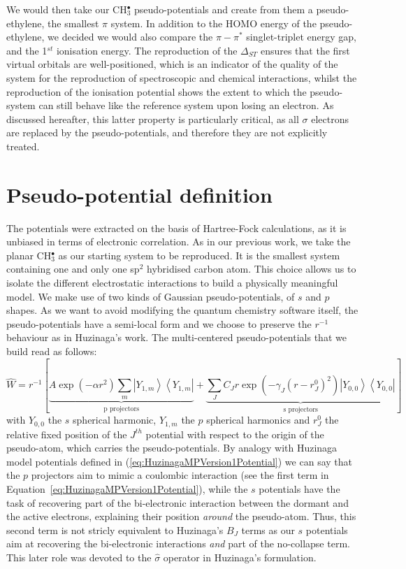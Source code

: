 \documentclass[12pt]{article}
\begin{document}
We would then take our CH$_3^{\bullet}$ pseudo-potentials and create from them a pseudo-ethylene, the smallest $\pi$ system.
In addition to the HOMO energy of the pseudo-ethylene, we decided we would also compare the $\pi-\pi^{*}$ singlet-triplet energy gap, 
and the 1$^{st}$ ionisation energy. 
The reproduction of the $\Delta_{ST}$ ensures that the first virtual 
orbitals are well-positioned, which is an indicator of the quality of the system for the reproduction of spectroscopic and 
chemical interactions, whilst the reproduction of the ionisation potential shows the extent to which the pseudo-system 
can still behave like the reference system upon losing an electron. As discussed hereafter, this latter property is 
particularly critical, as all $\sigma$ electrons are replaced by the pseudo-potentials, and therefore
they are not explicitly treated. 

\section*{\sffamily \large Pseudo-potential definition} \label{secpotdef}

The potentials were extracted on the basis of Hartree-Fock calculations, as it is unbiased in terms of
electronic correlation. 
As in our previous work,\cite{drujon_pseudopotentials_2013}
we take the planar CH\(^{\bullet}_{3}\) as our starting system to be reproduced.
It is the smallest system containing one and only one sp$^2$ hybridised carbon atom. This choice allows us to isolate the different electrostatic interactions to build a physically meaningful model. We make use of two kinds of Gaussian pseudo-potentials,\cite{me_structure_theory} of \(s\) and \(p\) shapes. As we want to avoid modifying the quantum chemistry software itself, the pseudo-potentials have a semi-local form and we choose to preserve the \(r^{-1}\) behaviour as in Huzinaga's work.
The multi-centered pseudo-potentials that we build read as follows:
\begin{equation}
\label{eq:ourPP}
\hat{W} = r^{-1}\left[%
\underbrace{A\exp(-\alpha r^2)\sum_m\left|Y_{1,m}\right>\left<Y_{1,m}\right|}_{\text{p projectors}}%
+%
\underbrace{\sum_JC_Jr\exp(-\gamma_J (r-r^0_J)^2)\left|Y_{0,0}\right>\left<Y_{0,0}\right|}_{\text{s projectors}}%
\right]
\end{equation}
with $Y_{0,0}$ the $s$ spherical harmonic, $Y_{1,m}$ the $p$ spherical harmonics and $r^0_J$ the relative fixed position of the $J^{th}$ potential with respect to the origin of the pseudo-atom, which carries the pseudo-potentials.
By analogy with Huzinaga model potentials defined in (\ref{eq:HuzinagaMPVersion1Potential})
we can say that the $p$ projectors aim to mimic a coulombic interaction (see the first term in Equation~\ref{eq:HuzinagaMPVersion1Potential}),
while the $s$ potentials have the task of recovering part of the bi-electronic interaction
between the dormant and the active electrons, explaining their position \textit{around} the pseudo-atom.
Thus, this second term is not stricly equivalent to Huzinaga's $B_J$ terms as our $s$ potentials aim at recovering
the bi-electronic interactions \textit{and} part of the no-collapse term.
This later role was devoted to the $\hat{\sigma}$ operator in Huzinaga's formulation.
\end{document}
